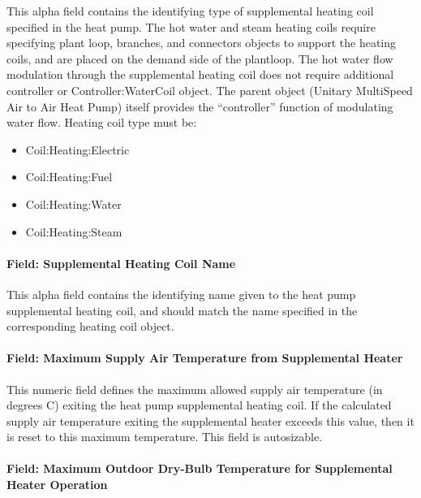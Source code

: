 This alpha field contains the identifying type of supplemental heating coil specified in the heat pump. The hot water and steam heating coils require specifying plant loop, branches, and connectors objects to support the heating coils, and are placed on the demand side of the plantloop. The hot water flow modulation through the supplemental heating coil does not require additional controller or Controller:WaterCoil object. The parent object (Unitary MultiSpeed Air to Air Heat Pump) itself provides the ``controller'' function of modulating water flow. Heating coil type must be:

\begin{itemize}
\item
  Coil:Heating:Electric
\item
  Coil:Heating:Fuel
\item
  Coil:Heating:Water
\item
  Coil:Heating:Steam
\end{itemize}

\paragraph{Field: Supplemental Heating Coil Name}\label{field-supplemental-heating-coil-name-2}

This alpha field contains the identifying name given to the heat pump supplemental heating coil, and should match the name specified in the corresponding heating coil object.

\paragraph{Field: Maximum Supply Air Temperature from Supplemental Heater}\label{field-maximum-supply-air-temperature-from-supplemental-heater-1}

This numeric field defines the maximum allowed supply air temperature (in degrees C) exiting the heat pump supplemental heating coil. If the calculated supply air temperature exiting the supplemental heater exceeds this value, then it is reset to this maximum temperature. This field is autosizable.

\paragraph{Field: Maximum Outdoor Dry-Bulb Temperature for Supplemental Heater Operation}\label{field-maximum-outdoor-dry-bulb-temperature-for-supplemental-heater-operation-2}

